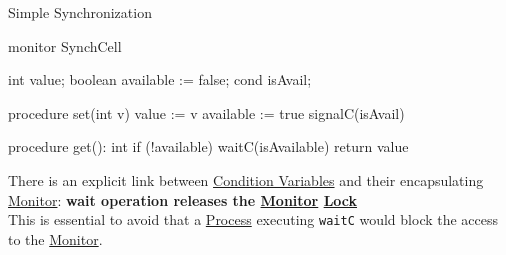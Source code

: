 \begin{example}{Simple Synchronization}{}
    \begin{codeblock}{}
    monitor SynchCell {
        int value;
        boolean available := false;
        cond isAvail;

        procedure set(int v) {
            value := v
            available := true
            signalC(isAvail)
        }

        procedure get(): int {
            if (!available)
                waitC(isAvailable)
            return value
        }
    }
    \end{codeblock}
\end{example}
\begin{remark}{}{}
    There is an explicit link between \hyperref[def:cond-vars]{Condition Variables} and their encapsulating \hyperref[def:monitor]{Monitor}: \textbf{wait operation releases the \hyperref[def:monitor]{Monitor} \hyperref[sub:cp_locks]{Lock}}
    \\
    This is essential to avoid that a \hyperref[def:process]{Process} executing \texttt{waitC} would block the access to the \hyperref[def:monitor]{Monitor}.
\end{remark}
%
